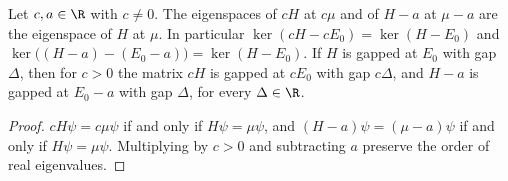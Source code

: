 \begin{lemma}
    \label{lem:hamiltonians_gap_scaling}
    \leanok
    Let $c,a\in\R$ with $c\neq0$. The eigenspaces of $cH$ at $c\mu$ and of
    $H-a$ at $\mu-a$ are the eigenspace of $H$ at $\mu$. In particular
    $\ker(cH-cE_0)=\ker(H-E_0)$ and $\ker\bigl((H-a)-(E_0-a)\bigr)=\ker(H-E_0)$. If $H$
    is gapped at $E_0$ with gap $\Delta$, then for $c>0$ the matrix $cH$ is gapped
    at $cE_0$ with gap $c\Delta$, and $H-a$ is gapped at $E_0-a$ with gap $\Delta$,
    for every $\Delta\in\R$.
\end{lemma}
\begin{proof}\leanok
    $cH\psi=c\mu\psi$ if and only if $H\psi=\mu\psi$, and
    $(H-a)\psi=(\mu-a)\psi$ if and only if $H\psi=\mu\psi$. Multiplying by
    $c>0$ and subtracting $a$ preserve the order of real eigenvalues.
\end{proof}

